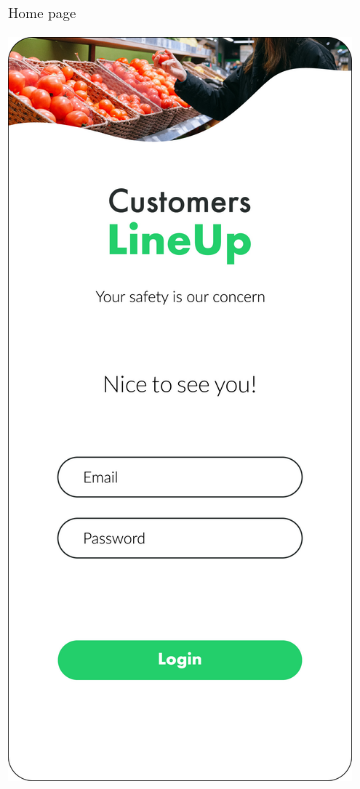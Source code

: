 \begin{figure}[H]
\begin{subfigure}[t]{0.28\textwidth}
        \caption*{Home page}
    \end{subfigure}
    \quad
    \begin{subfigure}[t]{0.28\textwidth} 
        \includegraphics{../mockups/sign_in}

\end{subfigure}
\end{figure}
